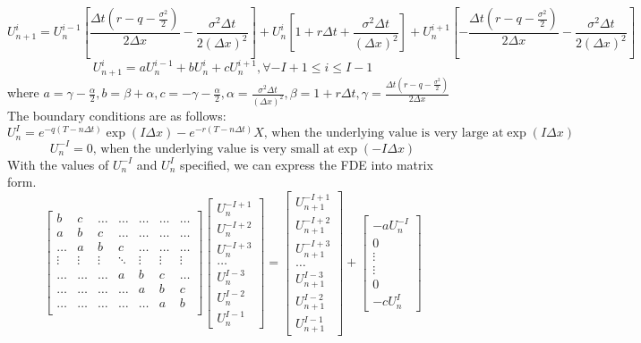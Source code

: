 $$ U_{n+1}^{i} = U_{n}^{i-1}[\frac{\Delta t(r - q - \frac{\sigma^{2}}{2})}{2\Delta x} -\frac{\sigma^{2}\Delta t}{2(\Delta x)^{2}}] + U_{n}^{i} [1+ r \Delta t + \frac{\sigma ^ {2} \Delta t}{(\Delta x)^{2}}] + U_{n}^{i+1}[- \frac{\Delta t(r - q - \frac{\sigma^{2}}{2})}{2\Delta x} -\frac{\sigma^{2}\Delta t}{2(\Delta x)^{2}} ]$$
$$ U_{n+1}^{i} = aU_{n}^{i-1}+ bU_{n}^{i} + cU_{n}^{i+1} , \forall -I+1 \le i \le I-1$$
\hspace*{100pt} where $a = \gamma-\frac{\alpha}{2}, b = \beta + \alpha, c = -\gamma-\frac{\alpha}{2}, \alpha = \frac{\sigma^{2}\Delta t}{(\Delta x)^{2}}, \beta = 1+ r \Delta t, \gamma = \frac{\Delta t(r - q - \frac{\sigma^{2}}{2})}{2\Delta x}$\\[3mm]
The boundary conditions are as follows:\\
$$U_{n}^{I} = e^{-q(T-n \Delta t)}\exp(I\Delta x) - e^{-r(T-n \Delta t)}X \text{, when the underlying value is very large at} \exp(I\Delta x)$$
$$U_{n}^{-I} = 0\text{, when the underlying value is very small at} \exp(-I\Delta x)$$
\newpage
With the values of $U_{n}^{-I}$ and $U_{n}^{I}$ specified, we can express the FDE into matrix form.
\[
\begin{bmatrix}
    b & c & \dots & \dots  & \dots & \dots & \dots\\
    a & b & c & \dots  & \dots & \dots & \dots\\
    \dots & a & b & c & \dots & \dots & \dots\\
    \vdots & \vdots & \vdots & \ddots & \vdots & \vdots & \vdots \\
    \dots & \dots & \dots & a & b & c & \dots\\
    \dots & \dots & \dots & \dots & a & b & c\\
    \dots & \dots & \dots & \dots & \dots & a & b\\
\end{bmatrix}
\begin{bmatrix}
    U_{n}^{-I+1}\\
    U_{n}^{-I+2}\\
    U_{n}^{-I+3}\\
    \dots \\
    U_{n}^{I-3}\\
    U_{n}^{I-2}\\
    U_{n}^{I-1}
\end{bmatrix}
=
\begin{bmatrix}
    U_{n+1}^{-I+1}\\
    U_{n+1}^{-I+2}\\
    U_{n+1}^{-I+3}\\
    \dots \\
    U_{n+1}^{I-3}\\
    U_{n+1}^{I-2}\\
    U_{n+1}^{I-1}
\end{bmatrix}
+
\begin{bmatrix}
    -aU_{n}^{-I}\\
    0\\
    \vdots \\
    \vdots \\
    0\\
    -cU_{n}^{I}
\end{bmatrix}
\]

